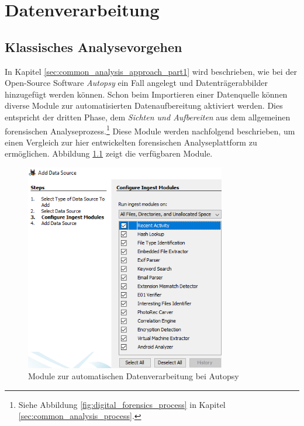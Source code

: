 \chapter{Datenverarbeitung}
\label{ch:data_processing}

\section{Klassisches Analysevorgehen}
\label{sec:common_analysis_approach_part2}

In Kapitel \ref{sec:common_analysis_approach_part1} wird beschrieben, wie bei der Open-Source Software \textit{Autopsy} ein Fall angelegt und Datenträgerabbilder hinzugefügt werden können. Schon beim Importieren einer Datenquelle können diverse Module zur automatisierten Datenaufbereitung aktiviert werden. Dies entspricht der dritten Phase, dem \textit{Sichten und Aufbereiten} aus dem allgemeinen forensischen Analyseprozess.\footnote{Siehe Abbildung \ref{fig:digital_forensics_process} in Kapitel \ref{sec:common_analysis_process}.} Diese Module werden nachfolgend beschrieben, um einen Vergleich zur hier entwickelten forensischen Analyseplattform zu ermöglichen.
Abbildung \ref{fig:autopsy_2_ingest_modules} zeigt die verfügbaren Module.

\begin{figure}[ht]
  \centering
  \includegraphics[width=0.78\textwidth]{./resource/autopsy_2_ingest_modules.png}
  \caption{Module zur automatischen Datenverarbeitung bei Autopsy}
  \label{fig:autopsy_2_ingest_modules}
\end{figure}

